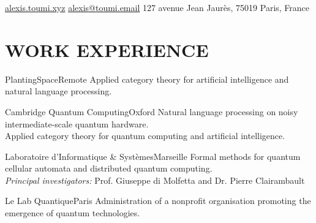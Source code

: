 \documentclass[a4paper,sans]{moderncv}
\begin{document}
\makecvtitle

\vspace{-40pt}

{\centering
    \hypersetup{urlcolor=orange}
    \homepagesymbol \href{https://alexis.toumi.xyz}{alexis.toumi.xyz}
    \hspace{25pt}
    \emailsymbol \href{mailto:alexis@toumi.email}{alexis@toumi.email}
    \hspace{25pt}
    127 avenue Jean Jaurès, 75019 Paris, France
    \par}

\vspace{40pt}

\section{\textbf{WORK EXPERIENCE}}

{PlantingSpace}{Remote}{}{
Applied category theory for artificial intelligence and natural language processing.
}

{Cambridge Quantum Computing}{Oxford}{}{
Natural language processing on noisy intermediate-scale quantum hardware.\\
Applied category theory for quantum computing and artificial intelligence.
}

{Laboratoire d'Informatique \& Syst\`emes}{Marseille}{}{
Formal methods for quantum cellular automata and distributed quantum computing.\\
\emph{Principal investigators:} Prof. Giuseppe di Molfetta and Dr. Pierre Clairambault
}

{Le Lab Quantique}{Paris}{}{
Administration of a nonprofit organisation promoting the emergence of quantum technologies.
}



\end{document}
